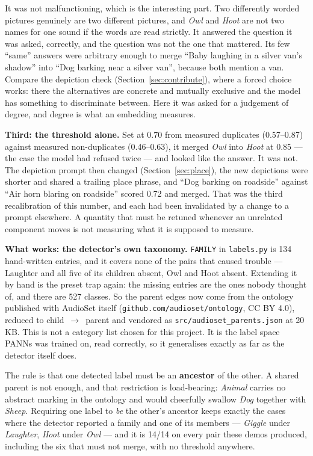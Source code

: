 \documentclass[11pt,a4paper]{article}
\begin{document}
It was not malfunctioning, which is the interesting part. Two differently worded pictures genuinely
are two different pictures, and \emph{Owl} and \emph{Hoot} are not two names for one sound if the
words are read strictly. It answered the question it was asked, correctly, and the question was not
the one that mattered. Its few ``same'' answers were arbitrary enough to merge ``Baby laughing in a
silver van's shadow'' into ``Dog barking near a silver van'', because both mention a van. Compare the
depiction check (Section~\ref{sec:contribute}), where a forced choice works: there the alternatives
are concrete and mutually exclusive and the model has something to discriminate between. Here it was
asked for a judgement of degree, and degree is what an embedding measures.

\textbf{Third: the threshold alone.} Set at 0.70 from measured duplicates (0.57--0.87) against
measured non-duplicates (0.46--0.63), it merged \emph{Owl} into \emph{Hoot} at 0.85 --- the case the
model had refused twice --- and looked like the answer. It was not. The depiction prompt then changed
(Section~\ref{sec:place}), the new depictions were shorter and shared a trailing place phrase, and
``Dog barking on roadside'' against ``Air horn blaring on roadside'' scored 0.72 and merged. That was
the third recalibration of this number, and each had been invalidated by a change to a prompt
elsewhere. A quantity that must be retuned whenever an unrelated component moves is not measuring
what it is supposed to measure.

\textbf{What works: the detector's own taxonomy.} \texttt{FAMILY} in \texttt{labels.py} is 134
hand-written entries, and it covers none of the pairs that caused trouble --- Laughter and all five
of its children absent, Owl and Hoot absent. Extending it by hand is the preset trap again: the
missing entries are the ones nobody thought of, and there are 527 classes. So the parent edges now
come from the ontology published with AudioSet itself (\texttt{github.com/audioset/ontology}, CC BY
4.0), reduced to child~$\rightarrow$~parent and vendored as \texttt{src/audioset\_parents.json} at
20\,KB. This is not a category list chosen for this project. It is the label space PANNs was trained
on, read correctly, so it generalises exactly as far as the detector itself does.

The rule is that one detected label must be an \textbf{ancestor} of the other. A shared parent is not
enough, and that restriction is load-bearing: \emph{Animal} carries no abstract marking in the
ontology and would cheerfully swallow \emph{Dog} together with \emph{Sheep}. Requiring one label to
\emph{be} the other's ancestor keeps exactly the cases where the detector reported a family and one of
its members --- \emph{Giggle} under \emph{Laughter}, \emph{Hoot} under \emph{Owl} --- and it is
14/14 on every pair these demos produced, including the six that must not merge, with no threshold
anywhere.
\end{document}
